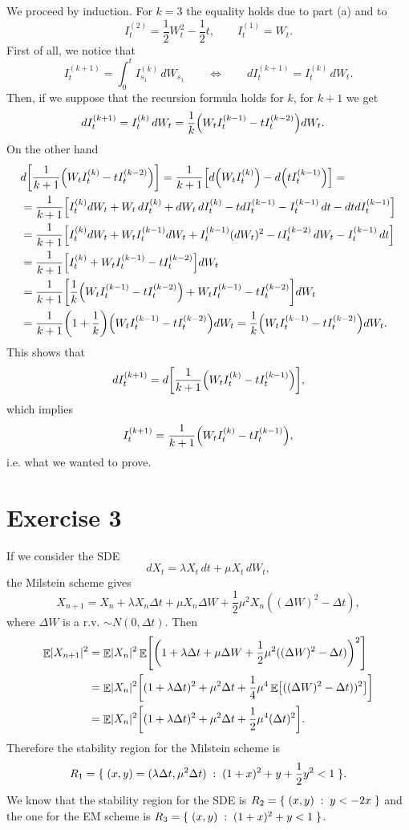 \documentclass[a4paper,11pt]{article}
\theoremstyle{definition}
\theoremstyle{plain}
\theoremstyle{remark}
\DeclarePairedDelimiter{\abs}{\lvert}{\rvert}
\DeclarePairedDelimiter{\parr}{(}{)}
\DeclarePairedDelimiter{\parq}{[}{]}
\DeclarePairedDelimiter{\bra}{\lbrace}{\rbrace}
\DeclareMathOperator*{\expval}{\mathbb{E}}
\begin{document}
We proceed by induction. For $k=3$ the equality holds due to part (a) and to 
$$
I^{(2)}_t = \frac{1}{2}W_t^2-\frac{1}{2}t,\qquad I^{(1)}_t = W_t.
$$
First of all, we notice that
$$
I_t^{(k+1)} = \int_0^tI_{s_1}^{(k)}\,dW_{s_1} \qquad\Longleftrightarrow\qquad dI_t^{(k+1)} = I_t^{(k)}\,dW_t.
$$
Then, if we suppose that the recursion formula holds for $k$, for $k+1$ we get
\begin{align*}
dI_t^{(k+1)} & = I_t^{(k)}\,dW_t = \frac{1}{k}\parr*{W_tI_t^{(k-1)}-tI_t^{(k-2)}}dW_t. 
\end{align*}
On the other hand
\begin{align*}
& d\parq*{\frac{1}{k+1}\parr*{W_tI_t^{(k)}-tI_t^{(k-2)}}} = \frac{1}{k+1}\parq*{d\parr*{W_tI_t^{(k)}}-d\parr*{tI_t^{(k-1)}}} = \\ &  = \frac{1}{k+1}\Big[I_t^{(k)}dW_t+W_t\,dI_t^{(k)}+dW_t\,dI_t^{(k)}-tdI_t^{(k-1)}-I_t^{(k-1)}\,dt -dtdI_t^{(k-1)}\Big] \\ & = \frac{1}{k+1}\parq*{I^{(k)}_tdW_t+W_tI^{(k-1)}_tdW_t + I^{(k-1)}_t(dW_t)^2-tI_t^{(k-2)}\,dW_t-I_t^{(k-1)}\,dt} \\ & = \frac{1}{k+1}\parq*{I^{(k)}_t+W_tI^{(k-1)}_t -tI_t^{(k-2)}}dW_t \\ & = \frac{1}{k+1}\parq*{\frac{1}{k}\parr*{W_tI^{(k-1)}_t -tI_t^{(k-2)}}+W_tI^{(k-1)}_t -tI_t^{(k-2)}}dW_t \\ & = \frac{1}{k+1}\parr*{1+\frac{1}{k}}\parr*{W_tI^{(k-1)}_t -tI_t^{(k-2)}}dW_t = \frac{1}{k}\parr*{W_tI_t^{(k-1)}-tI_t^{(k-2)}}dW_t.
\end{align*}
This shows that 
$$
dI_t^{(k+1)} = d\parq*{\frac{1}{k+1}\parr*{W_tI_t^{(k)}-tI_t^{(k-1)}}},
$$
which implies
$$
I_t^{(k+1)} = \frac{1}{k+1}\parr*{W_tI_t^{(k)}-tI_t^{(k-1)}},
$$
i.e. what we wanted to prove.

\section*{Exercise 3}

If we consider the SDE
$$
dX_t = \lambda X_t\,dt + \mu X_t\,dW_t,
$$
the Milstein scheme gives
$$
X_{n+1} = X_n + \lambda X_n \Delta t + \mu X_n\Delta W + \frac{1}{2}\mu^2 X_n ((\Delta W)^2-\Delta t),
$$
where $\Delta W$ is a r.v. $\sim N(0,\Delta t)$. Then
\begin{align*}
\expval\abs{X_{n+1}}^2 & = \expval\abs{X_n}^2\expval\parq*{\parr*{1+\lambda\Delta t+\mu\Delta W + \frac{1}{2}\mu^2((\Delta W)^2-\Delta t)}^2} \\ & = \expval\abs{X_n}^2\parq*{(1+\lambda \Delta t)^2 + \mu^2\Delta t + \frac{1}{4}\mu^4\expval\parq*{((\Delta W)^2-\Delta t))^2}} \\ & = \expval\abs{X_n}^2\parq*{(1+\lambda \Delta t)^2 + \mu^2\Delta t + \frac{1}{2}\mu^4(\Delta t)^2}.
\end{align*}
Therefore the stability region for the Milstein scheme is
$$
R_1 = \bra{\;(x,y) = (\lambda\Delta t,\mu^2\Delta t)\;:\;(1+x)^2 + y + \frac{1}{2}y^2 < 1\;}.
$$
We know that the stability region for the SDE is $R_2 = \bra{\;(x,y)\;:\;y<-2x\;}$ and the one for the EM scheme is $R_3 = \bra{\;(x,y)\;:\;(1+x)^2 + y < 1\;}$.
\end{document}
